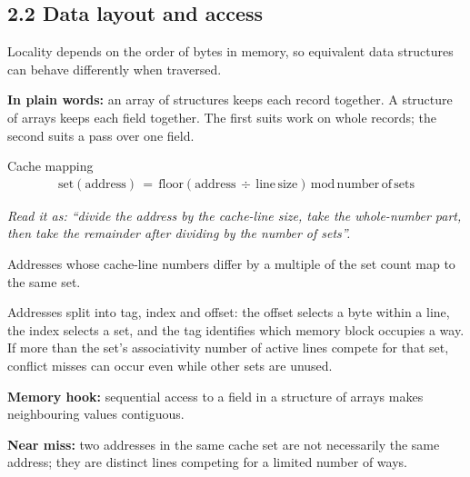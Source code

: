 \documentclass[11pt]{article}
\begin{document}
\begin{keepsection}
\section{2.2 Data layout and access}

Locality depends on the order of bytes in memory, so equivalent data structures can behave differently when traversed.

\begin{plainbox}\textbf{In plain words:} an array of structures keeps each record together. A structure of arrays keeps each field together. The first suits work on whole records; the second suits a pass over one field.\end{plainbox}

\begin{equationcard}{Cache mapping}
\[ \begin{gathered} \text{set}(\text{address})\, =\, \text{floor}(\text{address}\, ÷\, \text{line}\, \text{size})\, \text{mod}\, \text{number}\, \text{of}\, \text{sets} \end{gathered} \]
{\small \emph{Read it as: “divide the address by the cache-line size, take the whole-number part, then take the remainder after dividing by the number of sets”.}\par Addresses whose cache-line numbers differ by a multiple of the set count map to the same set.}
\end{equationcard}

Addresses split into tag, index and offset: the offset selects a byte within a line, the index selects a set, and the tag identifies which memory block occupies a way. If more than the set’s associativity number of active lines compete for that set, conflict misses can occur even while other sets are unused.

\begin{notebox}\textbf{Memory hook:} sequential access to a field in a structure of arrays makes neighbouring values contiguous.\end{notebox}

\begin{notebox}\textbf{Near miss:} two addresses in the same cache set are not necessarily the same address; they are distinct lines competing for a limited number of ways.\end{notebox}


\end{keepsection}
\end{document}
